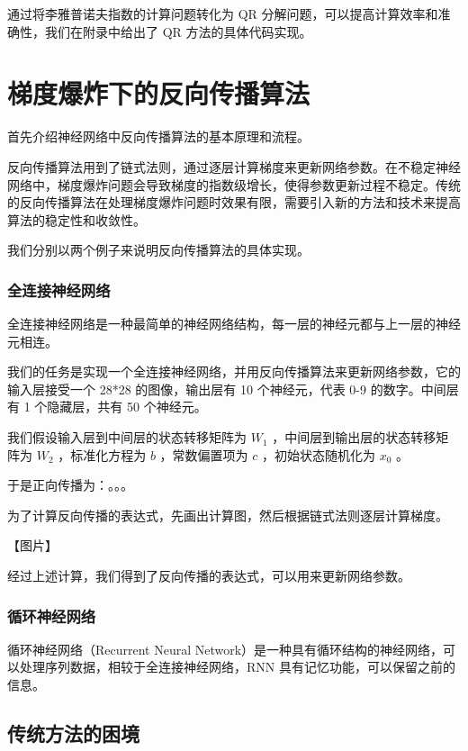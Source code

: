 \documentclass[12pt,a4paper]{amsart}
\begin{document}
通过将李雅普诺夫指数的计算问题转化为 QR 分解问题，可以提高计算效率和准确性，我们在附录中给出了 QR 方法的具体代码实现。

\section{梯度爆炸下的反向传播算法}

首先介绍神经网络中反向传播算法的基本原理和流程。

反向传播算法用到了链式法则，通过逐层计算梯度来更新网络参数。在不稳定神经网络中，梯度爆炸问题会导致梯度的指数级增长，使得参数更新过程不稳定。传统的反向传播算法在处理梯度爆炸问题时效果有限，需要引入新的方法和技术来提高算法的稳定性和收敛性。

我们分别以两个例子来说明反向传播算法的具体实现。

\subsubsection{全连接神经网络}

全连接神经网络是一种最简单的神经网络结构，每一层的神经元都与上一层的神经元相连。

我们的任务是实现一个全连接神经网络，并用反向传播算法来更新网络参数，它的输入层接受一个 28*28 的图像，输出层有 10 个神经元，代表 0-9 的数字。中间层有 1 个隐藏层，共有 50 个神经元。

我们假设输入层到中间层的状态转移矩阵为 $W_1$ ，中间层到输出层的状态转移矩阵为 $W_2$ ，标准化方程为 $b$ ，常数偏置项为 $c$ ，初始状态随机化为 $x_0$ 。

于是正向传播为：。。。

为了计算反向传播的表达式，先画出计算图，然后根据链式法则逐层计算梯度。

【图片】

经过上述计算，我们得到了反向传播的表达式，可以用来更新网络参数。

\subsubsection{循环神经网络}

循环神经网络（Recurrent Neural Network）是一种具有循环结构的神经网络，可以处理序列数据，相较于全连接神经网络，RNN 具有记忆功能，可以保留之前的信息。

\subsection{传统方法的困境}
\end{document}
